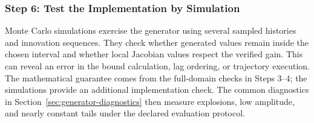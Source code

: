 \subsubsection{Step 6: Test the Implementation by Simulation}
Monte Carlo simulations exercise the generator using several sampled
histories and innovation sequences. They check whether generated values
remain inside the chosen interval and whether local Jacobian values respect
the verified gain. This can reveal an error in the bound calculation, lag
ordering, or trajectory execution. The mathematical guarantee comes from
the full-domain checks in Steps 3--4; the simulations provide an additional
implementation check. The common diagnostics in
Section~\ref{sec:generator-diagnostics} then measure explosions, low amplitude,
and nearly constant tails under the declared evaluation protocol.
